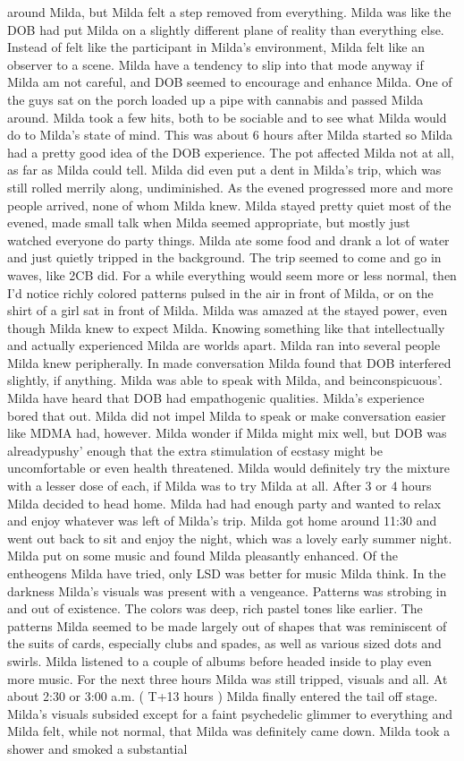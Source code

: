 \documentclass[12pt]{book}
\begin{document}
around Milda, but Milda felt a step removed from everything. Milda was like the DOB had put Milda on a slightly different plane of reality than everything else. Instead of felt like the participant in Milda's environment, Milda felt like an observer to a scene. Milda have a tendency to slip into that mode anyway if Milda am not careful, and DOB seemed to encourage and enhance Milda. One of the guys sat on the porch loaded up a pipe with cannabis and passed Milda around. Milda took a few hits, both to be sociable and to see what Milda would do to Milda's state of mind. This was about 6 hours after Milda started so Milda had a pretty good idea of the DOB experience. The pot affected Milda not at all, as far as Milda could tell. Milda did even put a dent in Milda's trip, which was still rolled merrily along, undiminished. As the evened progressed more and more people arrived, none of whom Milda knew. Milda stayed pretty quiet most of the evened, made small talk when Milda seemed appropriate, but mostly just watched everyone do party things. Milda ate some food and drank a lot of water and just quietly tripped in the background. The trip seemed to come and go in waves, like 2CB did. For a while everything would seem more or less normal, then I'd notice richly colored patterns pulsed in the air in front of Milda, or on the shirt of a girl sat in front of Milda. Milda was amazed at the stayed power, even though Milda knew to expect Milda. Knowing something like that intellectually and actually experienced Milda are worlds apart. Milda ran into several people Milda knew peripherally. In made conversation Milda found that DOB interfered slightly, if anything. Milda was able to speak with Milda, and beinconspicuous'. Milda have heard that DOB had empathogenic qualities. Milda's experience bored that out. Milda did not impel Milda to speak or make conversation easier like MDMA had, however. Milda wonder if Milda might mix well, but DOB was alreadypushy' enough that the extra stimulation of ecstasy might be uncomfortable or even health threatened. Milda would definitely try the mixture with a lesser dose of each, if Milda was to try Milda at all. After 3 or 4 hours Milda decided to head home. Milda had had enough party and wanted to relax and enjoy whatever was left of Milda's trip. Milda got home around 11:30 and went out back to sit and enjoy the night, which was a lovely early summer night. Milda put on some music and found Milda pleasantly enhanced. Of the entheogens Milda have tried, only LSD was better for music Milda think. In the darkness Milda's visuals was present with a vengeance. Patterns was strobing in and out of existence. The colors was deep, rich pastel tones like earlier. The patterns Milda seemed to be made largely out of shapes that was reminiscent of the suits of cards, especially clubs and spades, as well as various sized dots and swirls. Milda listened to a couple of albums before headed inside to play even more music. For the next three hours Milda was still tripped, visuals and all. At about 2:30 or 3:00 a.m. ( T+13 hours ) Milda finally entered the tail off stage. Milda's visuals subsided except for a faint psychedelic glimmer to everything and Milda felt, while not normal, that Milda was definitely came down. Milda took a shower and smoked a substantial 
\end{document}
